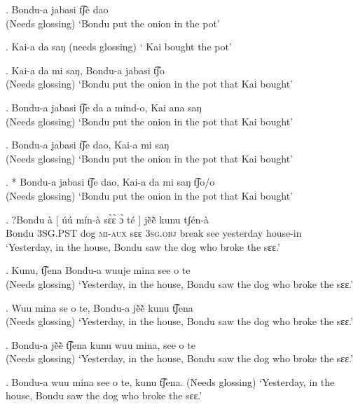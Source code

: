 \documentclass{assets/fieldnotes}
\begin{document}
{

\exg. Bondu-a jabasi t͡ʃè dao\\
(Needs glossing)
`Bondu put the onion in the pot'

\exg. Kai-a da saŋ
(needs glossing)
` Kai bought the pot'

\exg. Kai-a da mi saŋ, Bondu-a jabasi t͡ʃo\\
(Needs glossing)
`Bondu put the onion in the pot that Kai bought'

\exg. Bondu-a jabasi t͡ʃe da a mind-o, Kai ana saŋ\\
(Needs glossing)
`Bondu put the onion in the pot that Kai bought'

\exg. Bondu-a jabasi t͡ʃe dao, Kai-a mi saŋ\\
(Needs glossing)
`Bondu put the onion in the pot that Kai bought'

\exg. * Bondu-a jabasi t͡ʃe dao, Kai-a da mi saŋ t͡ʃo/o\\
(Needs glossing)
`Bondu put the onion in the pot that Kai bought'


\exg. ?Bondu à {[} úú mín-à sɛ̀ɛ̀ ɔ̀ té {]} jẽ̀ẽ̀ kunu tʃ\'{e}n-\`{a}\\
Bondu \textsc{3SG.PST} {} dog \textsc{mi-aux} sɛɛ \textsc{3sg.obj} break {} see yesterday house-in\\
`Yesterday, in the house, Bondu saw the dog who broke the sɛɛ.’

\exg. Kunu, t͡ʃena Bondu-a wuuje mina see o te\\
(Needs glossing)
`Yesterday, in the house, Bondu saw the dog who broke the sɛɛ.’

\exg. Wuu mina se o te, Bondu-a jẽ̀ẽ̀ kunu t͡ʃena\\
(Needs glossing)
`Yesterday, in the house, Bondu saw the dog who broke the sɛɛ.’

\exg. Bondu-a jẽ̀ẽ̀ t͡ʃena kunu wuu mina, see o te \\
(Needs glossing)
`Yesterday, in the house, Bondu saw the dog who broke the sɛɛ.’

\exg. Bondu-a wuu mina see o te, kunu t͡ʃena. 
(Needs glossing)
`Yesterday, in the house, Bondu saw the dog who broke the sɛɛ.’

}
\end{document}
